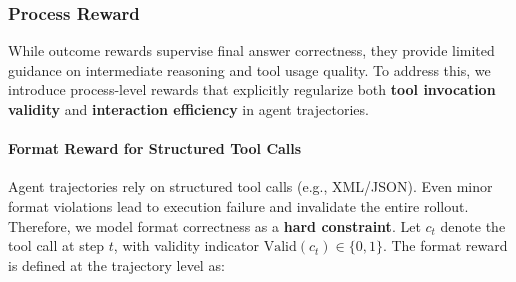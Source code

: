 \documentclass{huawei}
\begin{document}




\subsubsection{Process Reward}


While outcome rewards supervise final answer correctness, they provide limited guidance on intermediate reasoning and tool usage quality. To address this, we introduce process-level rewards that explicitly regularize both \textbf{tool invocation validity} and \textbf{interaction efficiency} in agent trajectories.

\paragraph{Format Reward for Structured Tool Calls}
Agent trajectories rely on structured tool calls (e.g., XML/JSON). Even minor format violations lead to execution failure and invalidate the entire rollout. Therefore, we model format correctness as a \textbf{hard constraint}.
Let $c_t$ denote the tool call at step $t$, with validity indicator $\text{Valid}(c_t) \in \{0,1\}$.
The format reward is defined at the trajectory level as:
\end{document}
